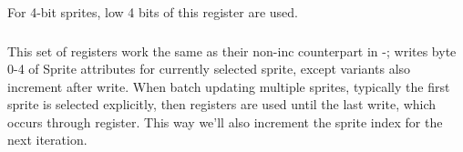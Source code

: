\begin{NextPort}
\end{NextPort}

For 4-bit sprites, low 4 bits of this register are used.


\subsubsection{}
\vspace*{-2ex}
\subsubsection{}
\vspace*{-2ex}
\subsubsection{}
\vspace*{-2ex}
\subsubsection{}
\vspace*{-2ex}
\subsubsection{}

This set of registers work the same as their non-inc counterpart in -; writes byte 0-4 of Sprite attributes for currently selected sprite, except  variants also increment  after write. When batch updating multiple sprites, typically the first sprite is selected explicitly, then  registers are used until the last write, which occurs through  register. This way we'll also increment the sprite index for the next iteration.


\pagebreak